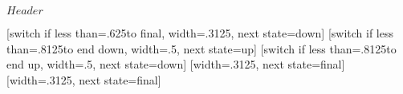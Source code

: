 %
%
%

\ProvidesFileRCS[v\pgfversion] $Header$


\newdimen\pgfsnakesegmentamplitude
\newdimen\pgfsnakesegmentlength
\def\pgfsnakesegmentangle{45}
\def\pgfsnakesegmentobjectlength{\pgfsnakesegmentamplitude}
\def\pgfsnakesegmentaspect{0.5}

\pgfsnakesegmentlength=10pt
\pgfsnakesegmentamplitude=2.5pt



%
%

{
  [switch if less than=.625\pgfsnakesegmentlength to final,
                  width=.3125\pgfsnakesegmentlength,
                  next state=down]
  { 
    \pgfpathcurveto
    {\pgfpoint{.125\pgfsnakesegmentlength}{0pt}}
    {\pgfpoint{.1875\pgfsnakesegmentlength}{\pgfsnakesegmentamplitude}}
    {\pgfpoint{.3125\pgfsnakesegmentlength}{\pgfsnakesegmentamplitude}}
  }
  [switch if less than=.8125\pgfsnakesegmentlength to end down,
               width=.5\pgfsnakesegmentlength,
               next state=up]
  {
    \pgfpathcosine{\pgfpoint{.25\pgfsnakesegmentlength}{-\pgfsnakesegmentamplitude}}
    \pgfpathsine{\pgfpoint{.25\pgfsnakesegmentlength}{-\pgfsnakesegmentamplitude}}
  }               
  [switch if less than=.8125\pgfsnakesegmentlength to end up,
             width=.5\pgfsnakesegmentlength,
             next state=down]
  {
    \pgfpathcosine{\pgfpoint{.25\pgfsnakesegmentlength}{\pgfsnakesegmentamplitude}}
    \pgfpathsine{\pgfpoint{.25\pgfsnakesegmentlength}{\pgfsnakesegmentamplitude}}
  }               
  [width=.3125\pgfsnakesegmentlength,
                   next state=final]
  {
    \pgfpathcurveto
    {\pgfpoint{.125\pgfsnakesegmentlength}{\pgfsnakesegmentamplitude}}
    {\pgfpoint{.1875\pgfsnakesegmentlength}{0pt}}
    {\pgfpoint{.3125\pgfsnakesegmentlength}{0pt}}
  }  
  [width=.3125\pgfsnakesegmentlength,
                 next state=final]
  {
    \pgfpathcurveto
    {\pgfpoint{.125\pgfsnakesegmentlength}{-\pgfsnakesegmentamplitude}}
    {\pgfpoint{.1875\pgfsnakesegmentlength}{0pt}}
    {\pgfpoint{.3125\pgfsnakesegmentlength}{0pt}}
  }  
  { \pgfpathlineto{\pgfpoint{\pgfsnakeremainingdistance}{0pt}} }
}




